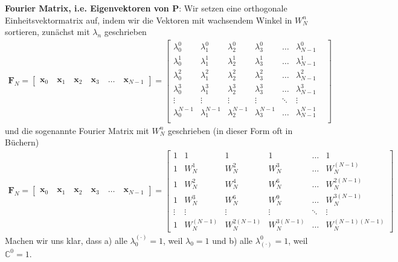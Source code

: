 \textbf{Fourier Matrix, i.e. Eigenvektoren von $\bm{P}$}:
Wir setzen eine orthogonale Einheitsvektormatrix
auf, indem wir die Vektoren mit
wachsendem Winkel in $W_N^n$ sortieren, zunächst mit $\lambda_n$ geschrieben
\begin{align}
\bm{F}_N =
\begin{bmatrix}
\bm{x}_0 \quad \bm{x}_1 \quad \bm{x}_2 \quad \bm{x}_3 \quad \dots \quad \bm{x}_{N-1}
\end{bmatrix}
=
\begin{bmatrix}
\lambda^0_0 & \lambda^0_1 & \lambda^0_2 & \lambda^0_3 & \dots & \lambda^0_{N-1}\\[1em]
\lambda^1_0 & \lambda^1_1 & \lambda^1_2 & \lambda^1_3 & \dots & \lambda^1_{N-1}\\[1em]
\lambda^2_0 & \lambda^2_1 & \lambda^2_2 & \lambda^2_3 & \dots & \lambda^2_{N-1}\\[1em]
\lambda^3_0 & \lambda^3_1 & \lambda^3_2 & \lambda^3_3 & \dots & \lambda^3_{N-1}\\[1em]
\vdots & \vdots & \vdots &\vdots &\ddots & \vdots\\[1em]
\lambda^{N-1}_0 & \lambda^{N-1}_1 & \lambda^{N-1}_2 & \lambda^{N-1}_3 & \dots & \lambda^{N-1}_{N-1} & \\
\end{bmatrix}
\end{align}
und die sogenannte Fourier Matrix mit $W_N^n$ geschrieben (in dieser Form oft in Büchern)
\begin{align}
\label{eq:DFT_FMatrix_WN}
\bm{F}_N =
\begin{bmatrix}
\bm{x}_0 \quad \bm{x}_1 \quad \bm{x}_2 \quad \bm{x}_3 \quad \dots \quad \bm{x}_{N-1}
\end{bmatrix}
=
\begin{bmatrix}
1 & 1 & 1 & 1 & \dots & 1\\[1em]
1 & W_N^1 & W_N^2 & W_N^3 & \dots & W_N^{(N-1)}\\[1em]
1 & W_N^2 & W_N^4 & W_N^6 & \dots & W_N^{2(N-1)}\\[1em]
1 & W_N^3 & W_N^6 & W_N^9 & \dots & W_N^{3(N-1)}\\[1em]
\vdots & \vdots & \vdots &\vdots &\ddots & \vdots\\[1em]
1 & W_N^{(N-1)} & W_N^{2(N-1)} & W_N^{3(N-1)} & \dots & W_N^{(N-1)(N-1)}
\end{bmatrix}
\end{align}
Machen wir uns klar, dass a) alle $\lambda_0^{(\cdot)} = 1$, weil $\lambda_0=1$
und b) alle $\lambda_{(\cdot)}^0 = 1$, weil $\mathbb{C}^0 = 1$.
%

